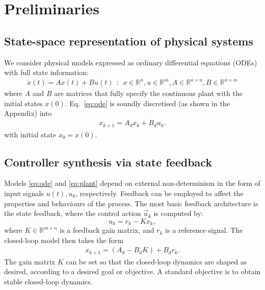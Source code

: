 \documentclass[runningheads,a4paper]{llncs}
\newcommand{\todo}[1]{{\color{red} TODO: #1}}
\begin{document}

\section{Preliminaries}
\label{sec:preliminaries}

\subsection{State-space representation of physical systems} 
\label{ssec:ssrepresentation}

We consider physical models expressed as ordinary differential equations (ODEs) with full state information:  
%
\begin{align}
\label{eq:ode}
\dot{x}(t) = Ax(t)+ B u(t)\ \ :\ \ x \in \mathbb{R}^{n}, u \in \mathbb{R}^m, A \in \mathbb{R}^{n \times n}, B \in \mathbb{R}^{n \times m}
\end{align}
where $A$ and $B$ are matrices that fully specify the continuous plant with the initial states $x(0)$. 
Eq.~\eqref{eq:ode} is soundly discretised (as shown in the Appendix) into
%
\begin{align}
\label{eq:plant}
x_{k+1} = A_d x_k+ B_d u_k. 
\end{align}
with initial state $x_{0}=x(0)$.

%

\subsection{Controller synthesis via state feedback}
\label{ssec:statefeedbackcontrol}

Models \eqref{eq:ode} and \eqref{eq:plant} depend on external non-determinism in the form of input signals $u (t), u_k$, respectively. 
Feedback can be employed to affect the properties and behaviours of the process. 
The most basic feedback architecture is the state feedback, 
where the control action $\vec{u}_k$ is computed by: 
%
\begin{equation}
\label{eq:controlaction}
u_k = r_{k} - K x_k, 
\end{equation}
%
where $K \in \mathbb{R}^{m \times n}$ is a feedback gain matrix, 
and $r_{k}$ is a reference signal.   
%
The closed-loop model then takes the form 
\begin{align}
\label{eq:closedloopss}
x_{k+1} = ( A_d - B_d K ) + B_d r_k.
\end{align}
The gain matrix $K$ can be set so that the closed-loop dynamics are shaped as desired, 
according to a desired goal or objective. 
A standard objective is to obtain stable closed-loop dynamics. 
\end{document}
